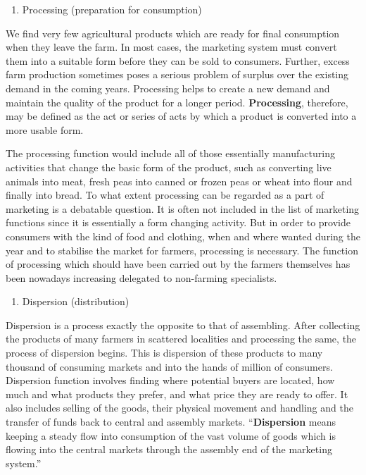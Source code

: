 \documentclass[11pt,]{book}
\providecommand{\tightlist}{%
  \setlength{\itemsep}{0pt}\setlength{\parskip}{0pt}}
\theoremstyle{definition}
\theoremstyle{definition}
\theoremstyle{definition}
\theoremstyle{remark}
\begin{document}
\begin{enumerate}
\def\labelenumi{\arabic{enumi}.}
\setcounter{enumi}{1}
\tightlist
\item
  Processing (preparation for consumption)
\end{enumerate}

We find very few agricultural products which are ready for final
consumption when they leave the farm. In most cases, the marketing
system must convert them into a suitable form before they can be sold to
consumers. Further, excess farm production sometimes poses a serious
problem of surplus over the existing demand in the coming years.
Processing helps to create a new demand and maintain the quality of the
product for a longer period. \textbf{Processing}, therefore, may be
defined as the act or series of acts by which a product is converted
into a more usable form.

The processing function would include all of those essentially
manufacturing activities that change the basic form of the product, such
as converting live animals into meat, fresh peas into canned or frozen
peas or wheat into flour and finally into bread. To what extent
processing can be regarded as a part of marketing is a debatable
question. It is often not included in the list of marketing functions
since it is essentially a form changing activity. But in order to
provide consumers with the kind of food and clothing, when and where
wanted during the year and to stabilise the market for farmers,
processing is necessary. The function of processing which should have
been carried out by the farmers themselves has been nowadays increasing
delegated to non-farming specialists.

\begin{enumerate}
\def\labelenumi{\arabic{enumi}.}
\setcounter{enumi}{2}
\tightlist
\item
  Dispersion (distribution)
\end{enumerate}

Dispersion is a process exactly the opposite to that of assembling.
After collecting the products of many farmers in scattered localities
and processing the same, the process of dispersion begins. This is
dispersion of these products to many thousand of consuming markets and
into the hands of million of consumers. Dispersion function involves
finding where potential buyers are located, how much and what products
they prefer, and what price they are ready to offer. It also includes
selling of the goods, their physical movement and handling and the
transfer of funds back to central and assembly markets.
``\textbf{Dispersion} means keeping a steady flow into consumption of
the vast volume of goods which is flowing into the central markets
through the assembly end of the marketing system.''
\end{document}
